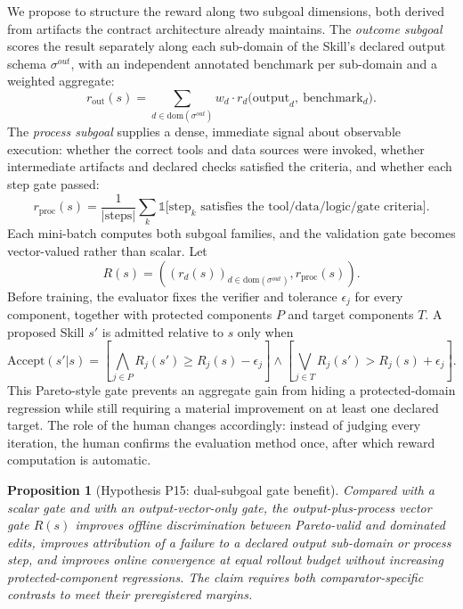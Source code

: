 \documentclass[11pt]{article}
\newtheorem{proposition}{Proposition}
\begin{document}
We propose to structure the reward along two subgoal dimensions, both derived from artifacts the contract architecture already maintains. The \textit{outcome subgoal} scores the result separately along each sub-domain of the Skill's declared output schema $\sigma^{out}$, with an independent annotated benchmark per sub-domain and a weighted aggregate:
\begin{equation}
r_{\mathrm{out}}(s)=\sum_{d\in\mathrm{dom}(\sigma^{out})} w_d \cdot r_d\big(\mathrm{output}_d,\ \mathrm{benchmark}_d\big).
\end{equation}
The \textit{process subgoal} supplies a dense, immediate signal about observable execution: whether the correct tools and data sources were invoked, whether intermediate artifacts and declared checks satisfied the criteria, and whether each step gate passed:
\begin{equation}
r_{\mathrm{proc}}(s)=\frac{1}{|\mathrm{steps}|}\sum_k \mathbb{1}\big[\mathrm{step}_k \text{ satisfies the tool/data/logic/gate criteria}\big].
\end{equation}
Each mini-batch computes both subgoal families, and the validation gate becomes vector-valued rather than scalar. Let
\begin{equation}
R(s)=\left(\left(r_d(s)\right)_{d\in\mathrm{dom}(\sigma^{out})},r_{\mathrm{proc}}(s)\right).
\end{equation}
Before training, the evaluator fixes the verifier and tolerance $\epsilon_j$ for every component, together with protected components $P$ and target components $T$. A proposed Skill $s'$ is admitted relative to $s$ only when
\begin{equation}
\mathrm{Accept}(s'|s)=
\left[\bigwedge_{j\in P}R_j(s')\geq R_j(s)-\epsilon_j\right]
\land
\left[\bigvee_{j\in T}R_j(s')>R_j(s)+\epsilon_j\right].
\end{equation}
This Pareto-style gate prevents an aggregate gain from hiding a protected-domain regression while still requiring a material improvement on at least one declared target. The role of the human changes accordingly: instead of judging every iteration, the human confirms the evaluation method once, after which reward computation is automatic.

\begin{proposition}[Hypothesis P15: dual-subgoal gate benefit]
\label{prop:p15}
Compared with a scalar gate and with an output-vector-only gate, the output-plus-process vector gate $R(s)$ improves offline discrimination between Pareto-valid and dominated edits, improves attribution of a failure to a declared output sub-domain or process step, and improves online convergence at equal rollout budget without increasing protected-component regressions. The claim requires both comparator-specific contrasts to meet their preregistered margins.
\end{proposition}
\end{document}
